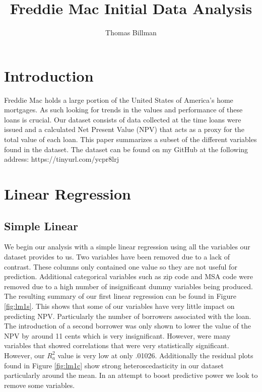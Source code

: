 \documentclass[10pt,twocolumn,letterpaper]{article}
\begin{document}
\title{Freddie Mac Initial Data Analysis}

\author{Thomas Billman}

\maketitle


\section{Introduction}

Freddie Mac holds a large portion of the United States of America's home mortgages. As such looking for trends in the values and performance of these loans is crucial. Our dataset consists of data collected at the time loans were issued and a calculated Net Present Value (NPV) that acts as a proxy for the total value of each loan. This paper summarizes a subset of the different variables found in the dataset. The dataset can be found on my GitHub at the following address:
https://tinyurl.com/ycpr8lrj

\section{Linear Regression}
\subsection{Simple Linear}
We begin our analysis with a simple linear regression using all the variables our dataset provides to us. Two variables have been removed due to a lack of contrast. These columns only contained one value so they are not useful for prediction. Additional categorical variables such as zip code and MSA code were removed due to a high number of insignificant dummy variables being produced. The resulting summary of our first linear regression can be found in Figure \ref{fig:lm1s}. This shows that some of our variables have very little impact on predicting NPV. Particularly the number of borrowers associated with the loan. The introduction of a second borrower was only shown to lower the value of the NPV by around 11 cents which is very insignificant. However, were many variables that showed correlations that were very statistically significant. However, our $R^2_a$ value is very low at only .01026. Additionally the residual plots found in Figure \ref{fig:lm1c} show strong heteroscedasticity in our dataset particularly around the mean. In an attempt to boost predictive power we look to remove some variables. 
\end{document}
